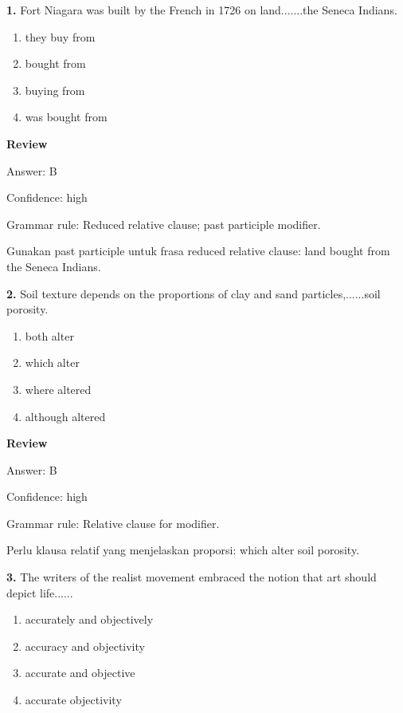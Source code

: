 \documentclass[12pt]{article}
\begin{document}
\noindent\textbf{1.} Fort Niagara was built by the French in 1726 on land.......the Seneca Indians.
\begin{enumerate}[label=(\Alph*),leftmargin=*,itemsep=0.2em]
\item they buy from
\item bought from
\item buying from
\item was bought from
\end{enumerate}
\par
\begingroup
\setlength{\parskip}{0pt}
\setlength{\parindent}{0pt}
\textbf{Review}\par
Answer: B\par
Confidence: high\par
Grammar rule: Reduced relative clause; past participle modifier.\par
Gunakan past participle untuk frasa reduced relative clause: land bought from the Seneca Indians.\par
\endgroup
\par
\vspace{0.25\baselineskip}
\noindent\textbf{2.} Soil texture depends on the proportions of clay and sand particles,......soil porosity.
\begin{enumerate}[label=(\Alph*),leftmargin=*,itemsep=0.2em]
\item both alter
\item which alter
\item where altered
\item although altered
\end{enumerate}
\par
\begingroup
\setlength{\parskip}{0pt}
\setlength{\parindent}{0pt}
\textbf{Review}\par
Answer: B\par
Confidence: high\par
Grammar rule: Relative clause for modifier.\par
Perlu klausa relatif yang menjelaskan proporsi: which alter soil porosity.\par
\endgroup
\par
\vspace{0.25\baselineskip}
\noindent\textbf{3.} The writers of the realist movement embraced the notion that art should depict life......
\begin{enumerate}[label=(\Alph*),leftmargin=*,itemsep=0.2em]
\item accurately and objectively
\item accuracy and objectivity
\item accurate and objective
\item accurate objectivity
\end{enumerate}
\end{document}
